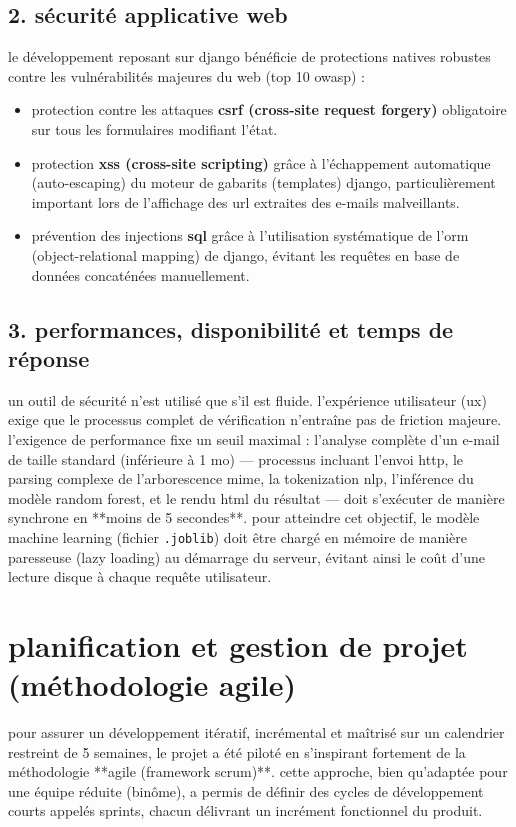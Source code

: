 \documentclass[12pt,a4paper]{report}
\begin{document}
\subsection{2. sécurité applicative web}
le développement reposant sur django bénéficie de protections natives robustes contre les vulnérabilités majeures du web (top 10 owasp) :
\begin{itemize}
    \item protection contre les attaques \textbf{csrf (cross-site request forgery)} obligatoire sur tous les formulaires modifiant l'état.
    \item protection \textbf{xss (cross-site scripting)} grâce à l'échappement automatique (auto-escaping) du moteur de gabarits (templates) django, particulièrement important lors de l'affichage des url extraites des e-mails malveillants.
    \item prévention des injections \textbf{sql} grâce à l'utilisation systématique de l'orm (object-relational mapping) de django, évitant les requêtes en base de données concaténées manuellement.
\end{itemize}

\subsection{3. performances, disponibilité et temps de réponse}
un outil de sécurité n'est utilisé que s'il est fluide. l'expérience utilisateur (ux) exige que le processus complet de vérification n'entraîne pas de friction majeure. l'exigence de performance fixe un seuil maximal : l'analyse complète d'un e-mail de taille standard (inférieure à 1 mo) — processus incluant l'envoi http, le parsing complexe de l'arborescence mime, la tokenization nlp, l'inférence du modèle random forest, et le rendu html du résultat — doit s'exécuter de manière synchrone en **moins de 5 secondes**.
pour atteindre cet objectif, le modèle machine learning (fichier \texttt{.joblib}) doit être chargé en mémoire de manière paresseuse (lazy loading) au démarrage du serveur, évitant ainsi le coût d'une lecture disque à chaque requête utilisateur.

\section{planification et gestion de projet (méthodologie agile)}
pour assurer un développement itératif, incrémental et maîtrisé sur un calendrier restreint de 5 semaines, le projet a été piloté en s'inspirant fortement de la méthodologie **agile (framework scrum)**. cette approche, bien qu'adaptée pour une équipe réduite (binôme), a permis de définir des cycles de développement courts appelés sprints, chacun délivrant un incrément fonctionnel du produit.
\end{document}
